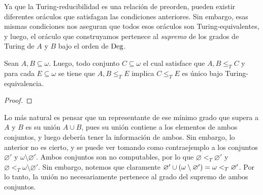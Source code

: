 \begin{agregado}
\begin{agregado}
Ya que la Turing-reducibilidad es una relación de preorden, pueden existir diferentes oráculos que satisfagan las condiciones anteriores. Sin embargo, esas mismas condiciones nos aseguran que todos esos oráculos son Turing-equivalentes, y luego, el oráculo que construyamos pertenece al \emph{supremo} de los grados de Turing de $A$ y $B$ bajo el orden de $\GRADOS$.

\begin{theorem}
	\label{theo: yunta_unica}
	Sean $A, B\subseteq\omega$. Luego, todo conjunto $C\subseteq\omega$ el cual satisface que $A, B\leq_{T} C$ y para cada $E\subseteq\omega$ se tiene que $A, B\leq_{T} E$ implica $C\leq_{T} E$ es único bajo Turing-equivalencia.
\end{theorem}

\begin{proof}


\end{proof}

Lo más natural es pensar que un representante de ese mínimo grado que supera a $A$ y $B$ es su unión $A\cup B$, pues su unión contiene a los elementos de ambos conjuntos, y luego debería tener la información de ambos. Sin embargo, lo anterior no es cierto, y se puede ver tomando como contraejemplo a los conjuntos $\varnothing'$ y $\omega\setminus\varnothing'$. Ambos conjuntos son no computables, por lo que $\varnothing <_{T}\varnothing'$ y $\varnothing <_{T}\omega\setminus\varnothing'$. Sin embargo, notemos que claramente $\varnothing'\cup\pa*{\omega\setminus\varnothing'} =\omega <_{T}\varnothing'$. Por lo tanto, la unión no necesariamente pertenece al grado del supremo de ambos conjuntos.


\end{agregado}
\end{agregado}
